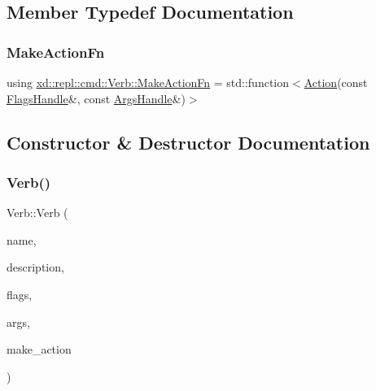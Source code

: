 \subsection{Member Typedef Documentation}
\mbox{\label{classxd_1_1repl_1_1cmd_1_1_verb_a4697828dfca6ef6386df54aa3a6a5857}} 
\subsubsection{\texorpdfstring{Make\+Action\+Fn}{MakeActionFn}}
{\footnotesize\ttfamily using \mbox{\hyperlink{classxd_1_1repl_1_1cmd_1_1_verb_a4697828dfca6ef6386df54aa3a6a5857}{xd\+::repl\+::cmd\+::\+Verb\+::\+Make\+Action\+Fn}} =  std\+::function$<$\mbox{\hyperlink{namespacexd_1_1repl_1_1cmd_a7274841bd02a9c5da0ba48ae204ab3d5}{Action}}(const \mbox{\hyperlink{classxd_1_1repl_1_1cmd_1_1_flags_handle}{Flags\+Handle}}\&, const \mbox{\hyperlink{classxd_1_1repl_1_1cmd_1_1_args_handle}{Args\+Handle}}\&)$>$}



\subsection{Constructor \& Destructor Documentation}
\mbox{\label{classxd_1_1repl_1_1cmd_1_1_verb_a3115cbb9c532e4774185ef04a51a28db}} 
\subsubsection{\texorpdfstring{Verb()}{Verb()}}
{\footnotesize\ttfamily Verb\+::\+Verb (\begin{DoxyParamCaption}\item[{std\+::string}]{name,  }\item[{std\+::string}]{description,  }\item[{std\+::vector$<$ \mbox{\hyperlink{classxd_1_1repl_1_1cmd_1_1_flag}{Flag}} $>$}]{flags,  }\item[{std\+::vector$<$ \mbox{\hyperlink{classxd_1_1repl_1_1cmd_1_1_argument}{Argument}} $>$}]{args,  }\item[{\mbox{\hyperlink{classxd_1_1repl_1_1cmd_1_1_verb_a4697828dfca6ef6386df54aa3a6a5857}{Make\+Action\+Fn}}}]{make\+\_\+action }\end{DoxyParamCaption})}



